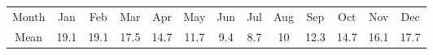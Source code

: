 \begin{tabular}{ccccccccccccc} \toprule
Month & Jan  & Feb  & Mar  & Apr  & May  & Jun & Jul & Aug & Sep  & Oct  & Nov  & Dec  \\
Mean  & 19.1 & 19.1 & 17.5 & 14.7 & 11.7 & 9.4 & 8.7 & 10  & 12.3 & 14.7 & 16.1 & 17.7 \\\bottomrule
\end{tabular}

